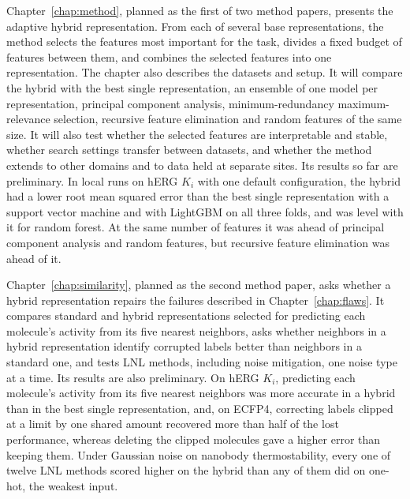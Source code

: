 Chapter~\ref{chap:method}, planned as the first of two method papers, presents the adaptive hybrid representation. From each of several base representations, the method selects the features most important for the task, divides a fixed budget of features between them, and combines the selected features into one representation. The chapter also describes the datasets and setup. It will compare the hybrid with the best single representation, an ensemble of one model per representation, principal component analysis, minimum-redundancy maximum-relevance selection, recursive feature elimination and random features of the same size. It will also test whether the selected features are interpretable and stable, whether search settings transfer between datasets, and whether the method extends to other domains and to data held at separate sites. Its results so far are preliminary. In local runs on hERG $K_i$ with one default configuration, the hybrid had a lower root mean squared error than the best single representation with a support vector machine and with LightGBM on all three folds, and was level with it for random forest. At the same number of features it was ahead of principal component analysis and random features, but recursive feature elimination was ahead of it.

Chapter~\ref{chap:similarity}, planned as the second method paper, asks whether a hybrid representation repairs the failures described in Chapter~\ref{chap:flaws}. It compares standard and hybrid representations selected for predicting each molecule's activity from its five nearest neighbors, asks whether neighbors in a hybrid representation identify corrupted labels better than neighbors in a standard one, and tests LNL methods, including noise mitigation, one noise type at a time. Its results are also preliminary. On hERG $K_i$, predicting each molecule's activity from its five nearest neighbors was more accurate in a hybrid than in the best single representation, and, on ECFP4, correcting labels clipped at a limit by one shared amount recovered more than half of the lost performance, whereas deleting the clipped molecules gave a higher error than keeping them. Under Gaussian noise on nanobody thermostability, every one of twelve LNL methods scored higher on the hybrid than any of them did on one-hot, the weakest input.

